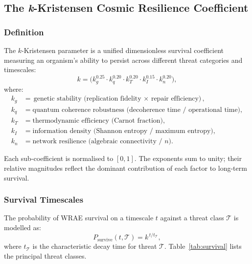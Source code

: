 \documentclass[12pt,a4paper]{article}
\begin{document}
\subsection{The \emph{k}-Kristensen Cosmic Resilience Coefficient}
\label{sec:k-kristensen}

\subsubsection{Definition}

The $k$-Kristensen parameter is a unified dimensionless survival coefficient
measuring an organism's ability to persist across different threat categories
and timescales:
\begin{equation}
k = \Big(
    k_g^{0.25} \cdot
    k_q^{0.20} \cdot
    k_T^{0.20} \cdot
    k_I^{0.15} \cdot
    k_n^{0.20}
\Big),
\label{eq:k-kristensen}
\end{equation}
where:
\begin{align*}
k_g &= \text{genetic stability (replication fidelity $\times$ repair efficiency)}, \\
k_q &= \text{quantum coherence robustness (decoherence time / operational time)}, \\
k_T &= \text{thermodynamic efficiency (Carnot fraction)}, \\
k_I &= \text{information density (Shannon entropy / maximum entropy)}, \\
k_n &= \text{network resilience (algebraic connectivity / $n$)}.
\end{align*}

Each sub-coefficient is normalised to $[0, 1]$.  The exponents sum to unity;
their relative magnitudes reflect the dominant contribution of each factor
to long-term survival.

\subsubsection{Survival Timescales}

The probability of WRAE survival on a timescale $t$ against a threat class
$\mathcal{T}$ is modelled as:
\begin{equation}
P_\mathrm{survive}(t, \mathcal{T}) = k^{\,t / t_{\mathcal{T}}},
\label{eq:survival-prob}
\end{equation}
where $t_{\mathcal{T}}$ is the characteristic decay time for threat $\mathcal{T}$.
Table~\ref{tab:survival} lists the principal threat classes.
\end{document}
